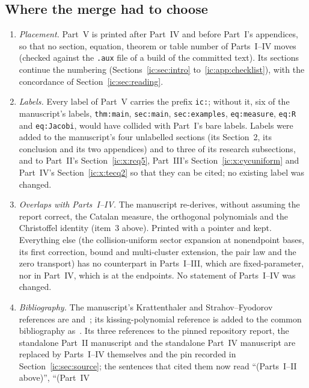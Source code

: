 \documentclass[11pt,a4paper]{article}
\numberwithin{equation}{section}
\theoremstyle{definition}
\theoremstyle{remark}
\begin{document}
\subsection{Where the merge had to choose}\label{ic:sec:merge}
\begin{enumerate}[leftmargin=*,itemsep=2pt]
\item \emph{Placement.}  Part~V is printed after Part~IV and before Part~I's
 appendices, so that no section, equation, theorem or table number of
 Parts~I--IV moves (checked against the \texttt{.aux} file of a build of the
 committed text).  Its sections continue the numbering
 (Sections~\ref{ic:sec:intro} to~\ref{ic:app:checklist}), with the
 concordance of Section~\ref{ic:sec:reading}.
\item \emph{Labels.}  Every label of Part~V carries the prefix \texttt{ic:};
 without it, six of the manuscript's labels, \texttt{thm:main},
 \texttt{sec:main}, \texttt{sec:examples}, \texttt{eq:measure},
 \texttt{eq:R} and \texttt{eq:Jacobi}, would have collided with Part~I's bare
 labels.  Labels were added to the manuscript's four unlabelled sections
 (its Section~2, its conclusion and its two appendices) and to three of its
 research subsections, and to Part~II's Section~\ref{ic:x:rcq5}, Part~III's
 Section~\ref{ic:x:cycuniform} and Part~IV's Section~\ref{ic:x:tecq2} so that
 they can be cited; no existing label was changed.
\item \emph{Overlaps with Parts~I--IV.}  The manuscript re-derives, without
 assuming the report correct, the Catalan measure, the orthogonal
 polynomials and the Christoffel identity (item~3 above).  Printed with a
 pointer and kept.  Everything else (the collision-uniform sector expansion
 at nonendpoint bases, its first correction, bound and multi-cluster
 extension, the pair law and the zero transport) has no counterpart in
 Parts~I--III, which are fixed-parameter, nor in Part~IV, which is at the
 endpoints.  No statement of Parts~I--IV was changed.
\item \emph{Bibliography.}  The manuscript's Krattenthaler and
 Strahov--Fyodorov references are \cite{Krattenthaler2023}
 and~\cite{StrahovFyodorov2003}; its kissing-polynomial reference is added to
 the common bibliography as~\cite{CelsusDeanoHuybrechsIserles2022}.  Its
 three references to the pinned repository report, the standalone Part~II
 manuscript and the standalone Part~IV manuscript are replaced by Parts~I--IV
 themselves and the pin recorded in Section~\ref{ic:sec:source}; the
 sentences that cited them now read ``(Parts~I--II above)'', ``(Part~IV

\end{enumerate}
\end{document}

